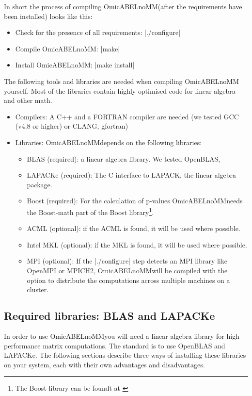\documentclass{report}
\newcommand{\oanomm}{OmicABELnoMM}
\begin{document}
In short the process of compiling \oanomm (after the requirements have
been installed) looks like this:
\begin{itemize}
\item Check for the presence of all requirements: |./configure|
\item Compile \oanomm: |make|
\item Install \oanomm: |make install|
\end{itemize}

The following tools and libraries are needed when compiling \oanomm
yourself. Most of the libraries contain highly optimised code for
linear algebra and other math.
\begin{itemize}
\item Compilers: A C++ and a FORTRAN compiler are needed (we tested
  GCC (v4.8 or higher) or CLANG, gfortran)
\item Libraries: \oanomm depends on the following libraries:
  \begin{itemize}
  \item \acs{BLAS} (required): a linear algebra library. We tested OpenBLAS,
  \item LAPACKe (required): The C interface to LAPACK, the linear
    algebra package.
  \item Boost (required): For the calculation of p-values \oanomm needs the
    Boost-math part of the Boost library\footnote{The Boost library
      can be foundt at \url{}}.
  \item \ac{ACML} (optional): if the \ac{ACML} is found,
    it will be used where possible.
  \item Intel \ac{MKL} (optional): if the \ac{MKL} is
    found, it will be used where possible.
  \item \acs{MPI} (optional): If the |./configure| step detects an
    \acf{MPI} library like OpenMPI or MPICH2, \oanomm will be compiled
    with the option to distribute the computations across multiple
    machines on a cluster.
  \end{itemize}
\end{itemize}


\subsection{Required libraries: \ac{BLAS} and LAPACKe}
In order to use \oanomm you will need a linear algebra library for
high performance matrix computations. The standard is to use OpenBLAS
and LAPACKe. The following sections describe three ways of installing
these libraries on your system, each with their own advantages and
disadvantages.
\end{document}
